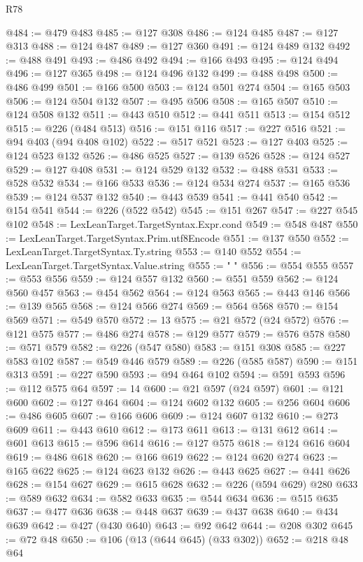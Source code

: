 \begin{lexlean}{R78}
\begin{coremodule}
@484 := @479 @483
@485 := @127 @308
@486 := @124 @485
@487 := @127 @313
@488 := @124 @487
@489 := @127 @360
@491 := @124 @489 @132
@492 := @488 @491
@493 := @486 @492
@494 := @166 @493
@495 := @124 @494
@496 := @127 @365
@498 := @124 @496 @132
@499 := @488 @498
@500 := @486 @499
@501 := @166 @500
@503 := @124 @501 @274
@504 := @165 @503
@506 := @124 @504 @132
@507 := @495 @506
@508 := @165 @507
@510 := @124 @508 @132
@511 := @443 @510
@512 := @441 @511
@513 := @154 @512
@515 := @226 (@484 @513)
@516 := @151 @116
@517 := @227 @516
@521 := @94 @403 (@94 @408 @102)
@522 := @517 @521
@523 := @127 @403
@525 := @124 @523 @132
@526 := @486 @525
@527 := @139 @526
@528 := @124 @527
@529 := @127 @408
@531 := @124 @529 @132
@532 := @488 @531
@533 := @528 @532
@534 := @166 @533
@536 := @124 @534 @274
@537 := @165 @536
@539 := @124 @537 @132
@540 := @443 @539
@541 := @441 @540
@542 := @154 @541
@544 := @226 (@522 @542)
@545 := @151 @267
@547 := @227 @545 @102
@548 := LexLeanTarget.TargetSyntax.Expr.cond
@549 := @548 @487
@550 := LexLeanTarget.TargetSyntax.Prim.utf8Encode
@551 := @137 @550
@552 := LexLeanTarget.TargetSyntax.Ty.string
@553 := @140 @552
@554 := LexLeanTarget.TargetSyntax.Value.string
@555 := " "
@556 := @554 @555
@557 := @553 @556
@559 := @124 @557 @132
@560 := @551 @559
@562 := @124 @560 @457
@563 := @454 @562
@564 := @124 @563
@565 := @443 @146
@566 := @139 @565
@568 := @124 @566 @274
@569 := @564 @568
@570 := @154 @569
@571 := @549 @570
@572 := 13
@575 := @21 @572 (@24 @572)
@576 := @121 @575
@577 := @486 @274
@578 := @129 @577
@579 := @576 @578
@580 := @571 @579
@582 := @226 (@547 @580)
@583 := @151 @308
@585 := @227 @583 @102
@587 := @549 @446 @579
@589 := @226 (@585 @587)
@590 := @151 @313
@591 := @227 @590
@593 := @94 @464 @102
@594 := @591 @593
@596 := @112 @575 @64
@597 := 14
@600 := @21 @597 (@24 @597)
@601 := @121 @600
@602 := @127 @464
@604 := @124 @602 @132
@605 := @256 @604
@606 := @486 @605
@607 := @166 @606
@609 := @124 @607 @132
@610 := @273 @609
@611 := @443 @610
@612 := @173 @611
@613 := @131 @612
@614 := @601 @613
@615 := @596 @614
@616 := @127 @575
@618 := @124 @616 @604
@619 := @486 @618
@620 := @166 @619
@622 := @124 @620 @274
@623 := @165 @622
@625 := @124 @623 @132
@626 := @443 @625
@627 := @441 @626
@628 := @154 @627
@629 := @615 @628
@632 := @226 (@594 @629) @280
@633 := @589 @632
@634 := @582 @633
@635 := @544 @634
@636 := @515 @635
@637 := @477 @636
@638 := @448 @637
@639 := @437 @638
@640 := @434 @639
@642 := @427 (@430 @640)
@643 := @92 @642
@644 := @208 @302
@645 := @72 @48
@650 := @106 (@13 (@644 @645) (@33 @302))
@652 := @218 @48 @64

\end{coremodule}
\end{lexlean}
